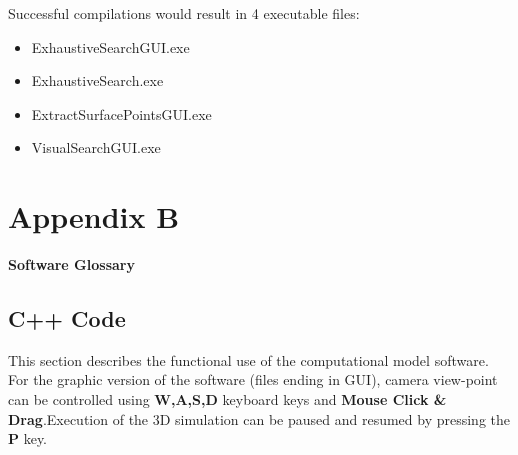 \documentclass{article}
\let \shorttitle \textbf
\begin{document}
Successful compilations would result in 4 executable files: 
\begin{itemize}
  \item ExhaustiveSearchGUI.exe 
  \item ExhaustiveSearch.exe
  \item ExtractSurfacePointsGUI.exe  
  \item VisualSearchGUI.exe
\end{itemize}

\section{Appendix B}
\shorttitle{Software Glossary}

\subsection{C++ Code}
This section describes the functional use of the computational model software. 
For the graphic version of the software (files ending in GUI), camera view-point can be controlled using \textbf{W,A,S,D} keyboard keys and \textbf{Mouse Click \& Drag}.Execution of the 3D simulation can be paused and resumed by pressing the \textbf{P} key.
\end{document}
